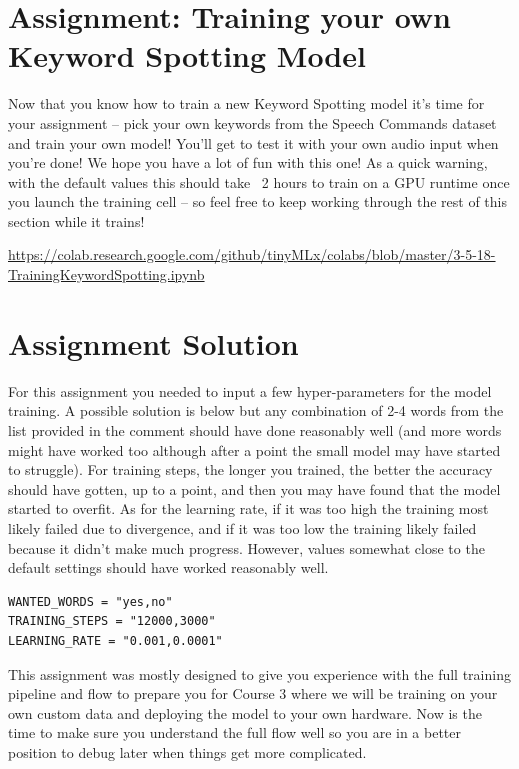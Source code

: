 \section{Assignment: Training your own Keyword Spotting Model}

Now that you know how to train a new Keyword Spotting model it's time for your assignment -- pick your own keywords from the Speech Commands dataset and train your own model! You’ll get to test it with your own audio input when you’re done! We hope you have a lot of fun with this one! As a quick warning, with the default values this should take ~2 hours to train on a GPU runtime once you launch the training cell -- so feel free to keep working through the rest of this section while it trains!

\url{https://colab.research.google.com/github/tinyMLx/colabs/blob/master/3-5-18-TrainingKeywordSpotting.ipynb}

\section{Assignment Solution}

For this assignment you needed to input a few hyper-parameters for the model training. A possible solution is below but any combination of 2-4 words from the list provided in the comment should have done reasonably well (and more words might have worked too although after a point the small model may have started to struggle). For training steps, the longer you trained, the better the accuracy should have gotten, up to a point, and then you may have found that the model started to overfit. As for the learning rate, if it was too high the training most likely failed due to divergence, and if it was too low the training likely failed because it didn’t make much progress. However, values somewhat close to the default settings should have worked reasonably well.

\begin{lstlisting}
WANTED_WORDS = "yes,no"
TRAINING_STEPS = "12000,3000"
LEARNING_RATE = "0.001,0.0001"
\end{lstlisting}

This assignment was mostly designed to give you experience with the full training pipeline and flow to prepare you for Course 3 where we will be training on your own custom data and deploying the model to your own hardware. Now is the time to make sure you understand the full flow well so you are in a better position to debug later when things get more complicated.

